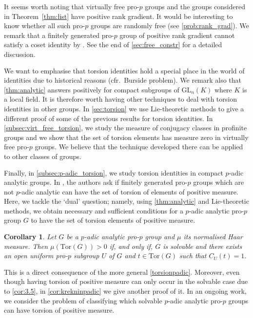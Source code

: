\documentclass[a4paper,10pt]{amsart}
\theoremstyle{plain}
\newtheorem{corABC}[thmABC]{Corollary}
\theoremstyle{definition}
\numberwithin{equation}{section}
\begin{document}
 It seems worth noting that virtually free pro-$p$ groups and the groups considered in Theorem~\ref{thm:list} have positive rank gradient. It would be interesting to know whether all such pro-$p$ groups are randomly free (see \cref{prob:rank_grad}). We remark that a finitely generated pro-$p$ group of positive rank gradient cannot satisfy a coset identity by \cite[Thm.~1.7]{Ni}. See the end of \cref{sec:free_constr} for a detailed discussion.

We want to emphasise that torsion identities hold a special place in the world of identities due to historical reasons (cfr.\ Burside problem). We remark also that \cref{thm:analytic} answers \cite[Conjecture 3]{LP00} positively for compact subgroups of $\mathrm{GL}_n(K)$ where $K$ is a local field. It is therefore worth having other techniques to deal with torsion identities in other groups. In \cref{sec:torsion} we use Lie-theoretic methods to give a different proof of some of the previous results for torsion identities. In \cref{subsec:virt_free_torsion}, we study the measure of conjugacy classes in profinite groups and we show that the set of torsion elements has measure zero in virtually free pro-$p$ groups. We believe that the technique developed there can be applied to other classes of groups. 

Finally, in \cref{subsec:p-adic_torsion}, we study torsion identities in compact $p$-adic analytic groups. In \cite{FR25}, the authors ask if finitely generated pro-$p$ groups which are not $p$-adic analytic can have the set of torsion of elements of positive measure. Here, we tackle the `dual' question; namely, using \cref{thm:analytic} and Lie-theoretic methods, we obtain necessary and sufficient conditions for a $p$-adic analytic pro-$p$ group $G$ to have the set of torsion elements of positive measure.
\begin{corABC}\label{cor:p-adic_pro-p_torsion}
    Let $G$ be a $p$-adic analytic pro-$p$ group and $\mu$ its normalised Haar measure. Then $\mu(\mathrm{Tor}(G)) > 0$ if, and only if, $G$ is solvable and there exists an open uniform pro-$p$ subgroup $U$ of $G$ and $t \in \mathrm{Tor}(G)$ such that $C_U(t)=1$.
\end{corABC}
This is a direct consequence of the more general \cref{torsionpadic}. Moreover, even though having torsion of positive measure can only occur in the solvable case due to \cref{cor:3.5}, in \cref{cor:krekninpadic} we give another proof of it. In an ongoing work, we consider the problem of classifying which solvable $p$-adic analytic pro-$p$ groups can have torsion of positive measure.
\end{document}
